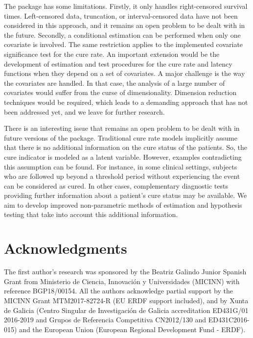 The  package has some limitations. Firstly, it only handles right-censored survival times. Left-censored data, truncation, or interval-censored data have not been considered in this approach, and it remains an open problem to be dealt with in the future. Secondly, a conditional estimation can be performed when only one covariate is involved. The same restriction applies to the implemented covariate significance test for the cure rate. An important extension would be the development of estimation and test procedures for the cure rate and latency functions when they depend on a set of covariates. A major challenge is the way the covariates are handled. In that case, the analysis of a large number of covariates would suffer from the curse of dimensionality. Dimension reduction techniques would be required, which leads to a demanding approach that has not been addressed yet, and we leave for further research.

There is an interesting issue that remains an open problem to be dealt with in future versions of the package. Traditional cure rate models implicitly assume that there is no additional information on the cure status of the patients. So, the cure indicator is modeled as a latent variable. However, examples contradicting this assumption can be found. For instance, in some clinical settings, subjects who are followed up beyond a threshold period without experiencing the event can be considered as cured. In other cases, complementary diagnostic tests providing further information about a patient's cure status may be available. We aim to develop improved non-parametric methods of estimation and hypothesis testing that take into account this additional information.



\section{Acknowledgments}
The first author's research was sponsored by the Beatriz Galindo Junior Spanish Grant from Ministerio de Ciencia, Innovación y Universidades (MICINN) with reference BGP18/00154. All the authors acknowledge partial support by the MICINN Grant MTM2017-82724-R (EU ERDF support included), and by Xunta de Galicia (Centro Singular de Investigaci\'on de Galicia accreditation ED431G/01 2016-2019 and Grupos de Referencia Competitiva CN2012/130 and ED431C2016-015) and the European Union (European Regional Development Fund - ERDF).




